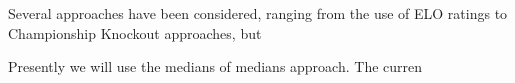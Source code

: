 \documentclass[12pt,a4paper]{article}
\begin{document}
Several approaches have been considered, ranging from the use of ELO ratings to Championship Knockout approaches, but 

Presently we will use the medians of medians approach. The curren





\end{document}
